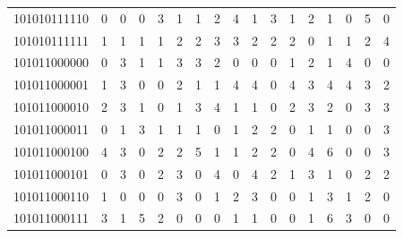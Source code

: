 \documentclass[10pt,a4paper]{article}
\begin{document}
\begin{longtable}{ |c|c|c|c|c|c|c|c|c|c|c|c|c|c|c|c|c| }
    101010111110              & 0                            & 0                                & 0                            & 3                              & 1   & 1   & 2   & 4   & 1   & 3   & 1   & 2   & 1   & 0   & 5   & 0   \\
    101010111111              & 1                            & 1                                & 1                            & 1                              & 2   & 2   & 3   & 3   & 2   & 2   & 2   & 0   & 1   & 1   & 2   & 4   \\
    101011000000              & 0                            & 3                                & 1                            & 1                              & 3   & 3   & 2   & 0   & 0   & 0   & 1   & 2   & 1   & 4   & 0   & 0   \\
    101011000001              & 1                            & 3                                & 0                            & 0                              & 2   & 1   & 1   & 4   & 4   & 0   & 4   & 3   & 4   & 4   & 3   & 2   \\
    101011000010              & 2                            & 3                                & 1                            & 0                              & 1   & 3   & 4   & 1   & 1   & 0   & 2   & 3   & 2   & 0   & 3   & 3   \\
    101011000011              & 0                            & 1                                & 3                            & 1                              & 1   & 1   & 0   & 1   & 2   & 2   & 0   & 1   & 1   & 0   & 0   & 3   \\
    101011000100              & 4                            & 3                                & 0                            & 2                              & 2   & 5   & 1   & 1   & 2   & 2   & 0   & 4   & 6   & 0   & 0   & 3   \\
    101011000101              & 0                            & 3                                & 0                            & 2                              & 3   & 0   & 4   & 0   & 4   & 2   & 1   & 3   & 1   & 0   & 2   & 2   \\
    101011000110              & 1                            & 0                                & 0                            & 0                              & 3   & 0   & 1   & 2   & 3   & 0   & 0   & 1   & 3   & 1   & 2   & 0   \\
    101011000111              & 3                            & 1                                & 5                            & 2                              & 0   & 0   & 0   & 1   & 1   & 0   & 0   & 1   & 6   & 3   & 0   & 0   \\

\end{longtable}
\end{document}
